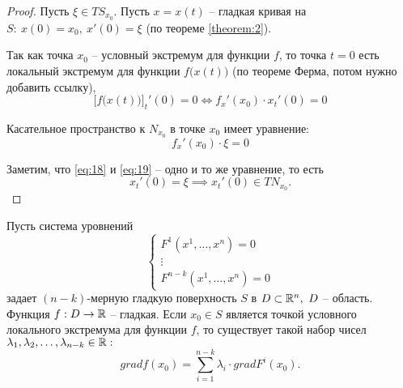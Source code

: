 \begin{proof}
    Пусть $\xi \in TS_{x_0}$. Пусть $x = x(t)$ -- гладкая кривая на $S: \ x(0) = x_0, \ x'(0) = \xi$ (по теореме \ref{theorem:2}).

    Так как точка $x_0$ -- условный экстремум для функции $f$, то точка $t = 0$ есть локальный экстремум для функции $f\big(x(t)\big)$ (по теореме Ферма, потом нужно добавить ссылку),
    \begin{equation}\label{eq:18}
        \Big[f\big(x(t)\big)\Big]_t'(0) = 0 \iff f_x'(x_0) \cdot x_t'(0) = 0
    \end{equation}

    Касательное пространство к $N_{x_0}$ в точке $x_0$ имеет уравнение:
    \begin{equation}\label{eq:19}
        f_x'(x_0)\cdot \xi = 0
    \end{equation}

    Заметим, что \ref{eq:18} и \ref{eq:19} -- одно и то же уравнение, то есть
    \[
        x_t'(0) = \xi \implies x_t'(0) \in TN_{x_0}.
    \]
\end{proof}

\begin{theorem}
    Пусть система уровнений
    \begin{equation}\label{eq:20}
        \left\{\begin{array}{l}
            F^1(x^1,\ldots,x^n) = 0 \\
            \vdots                  \\
            F^{n-k}(x^1,\ldots,x^n) = 0
        \end{array}\right.
    \end{equation}
    задает $(n-k)$-мерную гладкую поверхность $S$ в $D \subset \mathbb{R}^n, \ D$ -- область. Функция $f:D\rightarrow\mathbb{R}$ -- гладкая. Если $x_0 \in S$ является точкой условного локального экстремума для функции $f$, то существует такой набор чисел $\lambda_1,\lambda_2,\ldots,\lambda_{n-k} \in \mathbb{R}:$
    \[
        grad f(x_0) = \sum_{i = 1}^{n-k}\lambda_i \cdot grad F^i(x_0).
    \]
\end{theorem}

